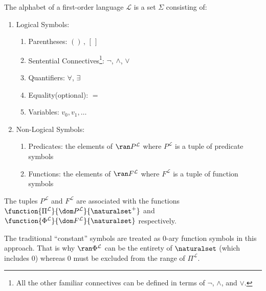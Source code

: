 \begin{dfn}
     \label{dfn:first-order-language}
    The alphabet of a first-order language \( \mathcal{L} \) is a set \( \Sigma \) consisting of:
    \begin{enumerate}[topsep=2pt,label=\textup{\texttt{(\alph*)}}]
        \item Logical Symbols:
            \begin{enumerate}[topsep=2pt,label=\arabic*.]
                \item Parentheses: \( () \, , \,[ \, ] \)
                \item Sentential Connectives\footnote{All the other familiar connectives can be defined in terms of \( \lnot \), \( \land \), and \( \lor \).}:
                    \( \lnot \), \( \land \), \( \lor \)
                \item Quantifiers: \( \forall \), \( \exists \)
                \item Equality(optional): \( = \)
                \item Variables: \( v_{0}, v_{1}, \dots \)
            \end{enumerate}
        \item Non-Logical Symbols:
            \begin{enumerate}[topsep=2pt,label=\arabic*.]
                \item Predicates: the elements of \( \ran P^{\mathcal{L}} \) where \( P^{\mathcal{L}} \) is a tuple of predicate symbols
                \item Functions: the elements of \( \ran F^{\mathcal{L}} \) where \( F^{\mathcal{L}} \) is a tuple of function symbols
            \end{enumerate}
    \end{enumerate}
\end{dfn}

\begin{dfn}
     \label{dfn:first-order-language-arity-functions}
    The tuples \( P^{\mathcal{L}} \) and \( F^{\mathcal{L}} \) are associated with the functions
    \( \function{\Pi^{\mathcal{L}}}{\dom P^{\mathcal{L}}}{\naturalset^{+} } \) and
    \( \function{\Phi^{\mathcal{L}}}{\dom F^{\mathcal{L}}}{\naturalset} \) respectively.
\end{dfn}

\begin{rem}
    The traditional ``constant'' symbols are treated as \( 0 \)-ary function symbols in this approach.
    That is why \( \ran \Phi^{\mathcal{L}} \) can be the entirety of \( \naturalset \) (which includes 0) whereas \( 0 \) must
    be excluded from the range of \( \Pi^{\mathcal{L}} \).
\end{rem}


